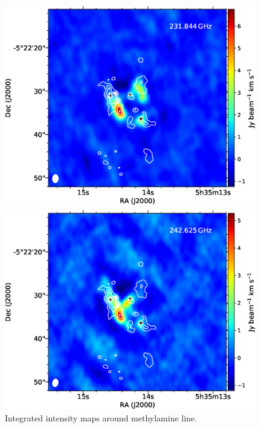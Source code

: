 \begin{figure}[htbp]
\begin{center}
\begin{minipage}{0.98\textwidth} 
\begin{center}
\begin{minipage}{0.48\textwidth}
\begin{center}
\includegraphics[width=0.98\textwidth]{OrionKL/mom0/231.844SV_mom0_3-7.eps}
\end{center}
\end{minipage}
\begin{minipage}{0.48\textwidth}
\begin{center}
\includegraphics[width=0.98\textwidth]{OrionKL/mom0/242.625SV_mom0_3-7.eps}
\end{center}
\end{minipage}
\end{center}
\end{minipage}

\caption{Integrated intensity maps around methylamine line.}
\end{center}
\end{figure}

